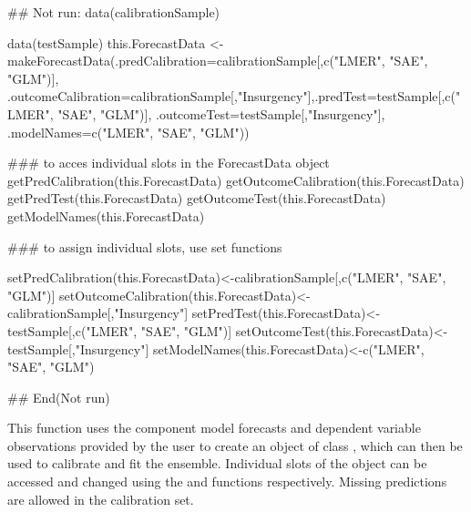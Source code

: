 \documentclass[a4paper]{book}
\begin{document}
\begin{Examples}
\begin{ExampleCode}
## Not run:  data(calibrationSample)

data(testSample)
this.ForecastData <- makeForecastData(.predCalibration=calibrationSample[,c("LMER", "SAE", "GLM")],
.outcomeCalibration=calibrationSample[,"Insurgency"],.predTest=testSample[,c("LMER", "SAE", "GLM")],
.outcomeTest=testSample[,"Insurgency"], .modelNames=c("LMER", "SAE", "GLM"))

### to acces individual slots in the ForecastData object
getPredCalibration(this.ForecastData)
getOutcomeCalibration(this.ForecastData)
getPredTest(this.ForecastData)
getOutcomeTest(this.ForecastData)
getModelNames(this.ForecastData)

### to assign individual slots, use set functions

setPredCalibration(this.ForecastData)<-calibrationSample[,c("LMER", "SAE", "GLM")]
setOutcomeCalibration(this.ForecastData)<-calibrationSample[,"Insurgency"]
setPredTest(this.ForecastData)<-testSample[,c("LMER", "SAE", "GLM")]
setOutcomeTest(this.ForecastData)<-testSample[,"Insurgency"]
setModelNames(this.ForecastData)<-c("LMER", "SAE", "GLM")

## End(Not run)
\end{ExampleCode}
\end{Examples}
%
\begin{Description}\relax
This function uses the component model forecasts and dependent variable observations provided by the user to create an object of class , which can then be used to calibrate and fit the ensemble. Individual slots of the  object can be accessed and changed using the  and  functions respectively. Missing predictions are allowed in the calibration set.
\end{Description}
\end{document}
